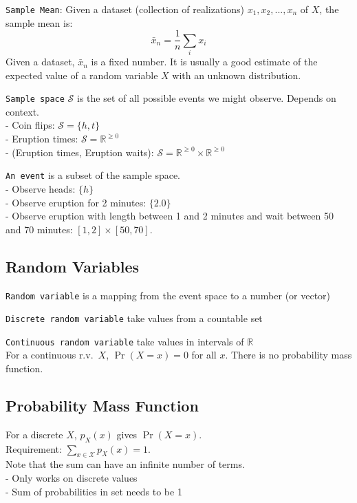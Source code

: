\documentclass[10pt,landscape,a4paper]{cheatsheet}
\newcommand{\Samp}{\mathcal{S}}
\renewcommand{\Re}{\mathbb{R}}
\begin{document}
  \texttt{Sample Mean}: Given a dataset (collection of realizations) $x_1, x_2, ..., x_n$ of $X$, the sample mean is:
   $$ \bar{x}_n = \frac{1}{n} \sum_i x_i $$
   Given a dataset, $\bar x_n$ is a fixed number. 
   It is usually a good estimate of the expected value of a random variable $X$ with an unknown distribution.\newline

  \texttt{Sample space} $\Samp$ is the set of all possible events we might observe. Depends on context.\\
    - Coin flips: $\Samp = \{ h, t \}$\\
    - Eruption times: $\Samp = \Re^{\ge 0}$\\
    - (Eruption times, Eruption waits): $\Samp = \Re^{\ge 0} \times \Re^{\ge 0}$ \newline

  \texttt{An event} is a subset of the sample space.\\
    - Observe heads: $\{ h \}$\\
    - Observe eruption for 2 minutes: $\{ 2.0 \}$\\
    - Observe eruption with length between 1 and 2 minutes and wait between 50 and 70 minutes: $[1,2] \times [50,70]$.

  \subsection{Random Variables}

  \texttt{Random variable} is a mapping from the event space to a number (or vector)\newline

  \texttt{Discrete random variable} take values from a countable set\newline

  \texttt{Continuous random variable} take values in intervals of $\Re$\\For a continuous r.v.\ $X$, $\Pr(X = x) = 0$ for all $x$. There is no probability mass function.

  \subsection{Probability Mass Function} 
  For a discrete $X$, $p_{X}(x)$ gives $\Pr(X = x)$.\\
  Requirement: $\sum_{x \in \mathcal{X}} p_{X}(x) = 1$.\\
  Note that the sum can have an infinite number of terms.\\
  - Only works on discrete values\\
  - Sum of probabilities in set needs to be 1
\end{document}
